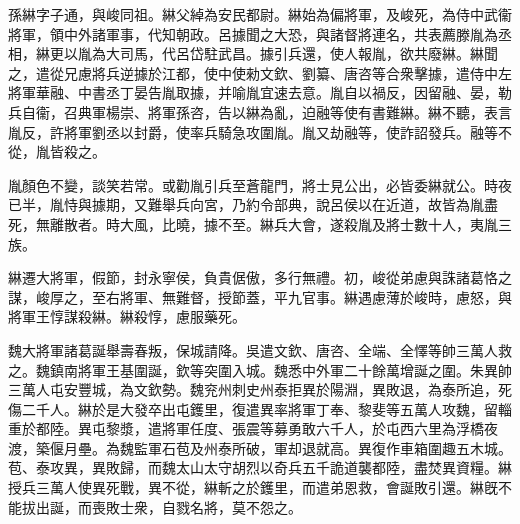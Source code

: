 \begin{pinyinscope}
 
 
 孫綝字子通，與峻同祖。綝父綽為安民都尉。綝始為偏將軍，及峻死，為侍中武衞將軍，領中外諸軍事，代知朝政。呂據聞之大恐，與諸督將連名，共表薦滕胤為丞相，綝更以胤為大司馬，代呂岱駐武昌。據引兵還，使人報胤，欲共廢綝。綝聞之，遣從兄慮將兵逆據於江都，使中使勑文欽、劉纂、唐咨等合衆擊據，遣侍中左將軍華融、中書丞丁晏告胤取據，并喻胤宜速去意。胤自以禍反，因留融、晏，勒兵自衞，召典軍楊崇、將軍孫咨，告以綝為亂，迫融等使有書難綝。綝不聽，表言胤反，許將軍劉丞以封爵，使率兵騎急攻圍胤。胤又劫融等，使詐詔發兵。融等不從，胤皆殺之。
 
 
 胤顏色不變，談笑若常。或勸胤引兵至蒼龍門，將士見公出，必皆委綝就公。時夜已半，胤恃與據期，又難舉兵向宮，乃約令部典，說呂侯以在近道，故皆為胤盡死，無離散者。時大風，比曉，據不至。綝兵大會，遂殺胤及將士數十人，夷胤三族。
 
 
 
 
 綝遷大將軍，假節，封永寧侯，負貴倨傲，多行無禮。初，峻從弟慮與誅諸葛恪之謀，峻厚之，至右將軍、無難督，授節蓋，平九官事。綝遇慮薄於峻時，慮怒，與將軍王惇謀殺綝。綝殺惇，慮服藥死。
 
 
 
 
 魏大將軍諸葛誕舉壽春叛，保城請降。吳遣文欽、唐咨、全端、全懌等帥三萬人救之。魏鎮南將軍王基圍誕，欽等突圍入城。魏悉中外軍二十餘萬增誕之圍。朱異帥三萬人屯安豐城，為文欽勢。魏兖州刺史州泰拒異於陽淵，異敗退，為泰所追，死傷二千人。綝於是大發卒出屯鑊里，復遣異率將軍丁奉、黎斐等五萬人攻魏，留輜重於都陸。異屯黎漿，遣將軍任度、張震等募勇敢六千人，於屯西六里為浮橋夜渡，築偃月壘。為魏監軍石苞及州泰所破，軍却退就高。異復作車箱圍趣五木城。苞、泰攻異，異敗歸，而魏太山太守胡烈以奇兵五千詭道襲都陸，盡焚異資糧。綝授兵三萬人使異死戰，異不從，綝斬之於鑊里，而遣弟恩救，會誕敗引還。綝旣不能拔出誕，而喪敗士衆，自戮名將，莫不怨之。
 

\end{pinyinscope}
